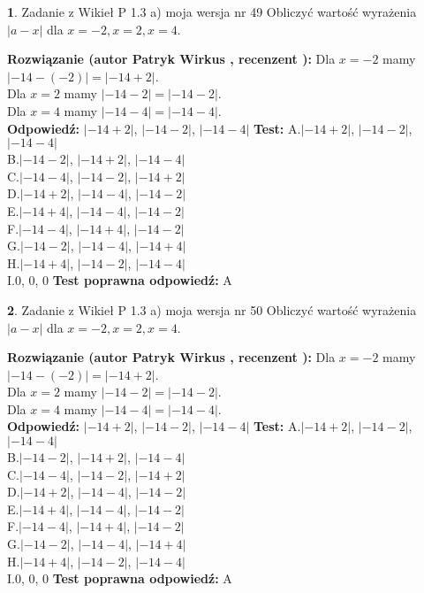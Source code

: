 \documentclass[12pt, a4paper]{article}
\theoremstyle{definition} %
\newtheorem{zad}{}
\newcommand{\zadStart}[1]{\begin{zad}#1\newline}
\newcommand{\zadStop}{\end{zad}}
\newcommand{\rozwStart}[2]{\noindent \textbf{Rozwiązanie (autor #1 , recenzent #2): }\newline}
\newcommand{\rozwStop}{\newline}
\newcommand{\odpStart}{\noindent \textbf{Odpowiedź:}\newline}
\newcommand{\odpStop}{\newline}
\newcommand{\testStart}{\noindent \textbf{Test:}\newline}
\newcommand{\testStop}{\newline}
\newcommand{\kluczStart}{\noindent \textbf{Test poprawna odpowiedź:}\newline}
\newcommand{\kluczStop}{\newline}
\begin{document}
\zadStart{Zadanie z Wikieł P 1.3 a) moja wersja nr 49}
Obliczyć wartość wyrażenia $|a - x|$ dla $x=-2,x=2,x=4$.
\zadStop
\rozwStart{Patryk Wirkus}{}
Dla $x = -2$ mamy $|-14 - (-2)| = |-14 + 2|$.\\
Dla $x = 2$ mamy $|-14 - 2| = |-14 - 2|$.\\
Dla $x = 4$ mamy $|-14 - 4| = |-14 - 4|$.\\
\rozwStop
\odpStart
$|-14 + 2|$, $|-14 - 2|$, $|-14 - 4|$
\odpStop
\testStart
A.$|-14 + 2|$, $|-14 - 2|$, $|-14 - 4|$\\
B.$|-14 - 2|$, $|-14 + 2|$, $|-14 - 4|$\\
C.$|-14 - 4|$, $|-14 - 2|$, $|-14 + 2|$\\
D.$|-14 + 2|$, $|-14 - 4|$, $|-14 - 2|$\\
E.$|-14 + 4|$, $|-14 - 4|$, $|-14 - 2|$\\
F.$|-14 - 4|$, $|-14 + 4|$, $|-14 - 2|$\\
G.$|-14 - 2|$, $|-14 - 4|$, $|-14 + 4|$\\
H.$|-14 + 4|$, $|-14 - 2|$, $|-14 - 4|$\\
I.$0$, $0$, $0$
\testStop
\kluczStart
A
\kluczStop



\zadStart{Zadanie z Wikieł P 1.3 a) moja wersja nr 50}
Obliczyć wartość wyrażenia $|a - x|$ dla $x=-2,x=2,x=4$.
\zadStop
\rozwStart{Patryk Wirkus}{}
Dla $x = -2$ mamy $|-14 - (-2)| = |-14 + 2|$.\\
Dla $x = 2$ mamy $|-14 - 2| = |-14 - 2|$.\\
Dla $x = 4$ mamy $|-14 - 4| = |-14 - 4|$.\\
\rozwStop
\odpStart
$|-14 + 2|$, $|-14 - 2|$, $|-14 - 4|$
\odpStop
\testStart
A.$|-14 + 2|$, $|-14 - 2|$, $|-14 - 4|$\\
B.$|-14 - 2|$, $|-14 + 2|$, $|-14 - 4|$\\
C.$|-14 - 4|$, $|-14 - 2|$, $|-14 + 2|$\\
D.$|-14 + 2|$, $|-14 - 4|$, $|-14 - 2|$\\
E.$|-14 + 4|$, $|-14 - 4|$, $|-14 - 2|$\\
F.$|-14 - 4|$, $|-14 + 4|$, $|-14 - 2|$\\
G.$|-14 - 2|$, $|-14 - 4|$, $|-14 + 4|$\\
H.$|-14 + 4|$, $|-14 - 2|$, $|-14 - 4|$\\
I.$0$, $0$, $0$
\testStop
\kluczStart
A
\kluczStop
\end{document}
